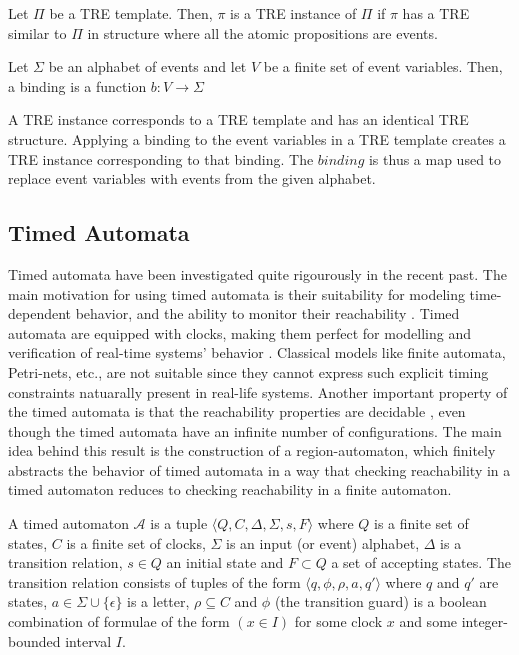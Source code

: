 \documentclass[]{sigplanconf}
\begin{document}
\begin{defns}
Let $\Pi$ be a TRE template. Then, $\pi$ is a TRE instance of $\Pi$ if $\pi$ has a TRE similar to $\Pi$ in structure where all the atomic propositions are events.
\end{defns}

\begin{defns}[Binding]
Let $\Sigma$ be an alphabet of events and let $V$ be a finite set of event variables. Then, a binding is a function $b \colon V \rightarrow \Sigma$
\end{defns}

A TRE instance corresponds to a TRE template and has an identical TRE structure. Applying a binding to the event variables in a TRE template creates a TRE instance corresponding to that binding. The $binding$ is thus a map used to replace event variables with events from the given alphabet.

\subsection{Timed Automata}

Timed automata \cite{Alur:1994:TTA:180782.180519} have been investigated quite rigourously in the recent past. The main motivation for using timed automata is their suitability for modeling time-dependent behavior, and the ability to monitor their reachability \cite{LPY97}. Timed automata are equipped with clocks, making them perfect for modelling and verification of real-time systems' behavior \cite{Alur:1994:TTA:180782.180519}. Classical models like finite automata, Petri-nets, etc., are not suitable since they cannot express such explicit timing constraints natuarally present in real-life systems. Another important property of the timed automata is that the reachability properties are decidable \cite{Alur:1994:TTA:180782.180519}, even though the timed automata have an infinite number of configurations. The main idea behind this result is the construction of a region-automaton, which finitely abstracts the behavior of timed automata in a way that checking reachability in a timed automaton reduces to checking reachability in a finite automaton.

\begin{defns}
A timed automaton  $\mathcal{A}$ is a tuple $\langle Q,C,\Delta ,\Sigma, s,F\rangle$ where $Q$ is a finite set of states, $C$ is a finite set of clocks, $\Sigma$ is an input (or event) alphabet, $\Delta$ is a transition relation, $s \in Q$ an initial state and $F \subset Q$ a set of accepting states. The transition relation consists of tuples of the form $\langle q ,\phi ,\rho, a, q' \rangle$ where $q$ and $q'$  are states, $a \in \Sigma \cup \{\epsilon \}$ is a letter, $\rho \subseteq C$ and $\phi$ (the transition guard) is a boolean combination of formulae of the form $(x \in I)$ for some clock $x$ and some integer-bounded interval $I$.
\end{defns}
\end{document}
